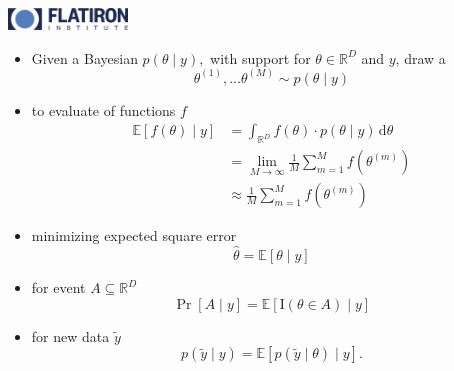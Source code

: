 \documentclass[10pt]{report}
\newcommand{\expect}[1]{\mathbb{E}\!\left[ #1 \right]}
\newcommand{\draw}[2]{#1^{(#2)}}
\begin{document}
\sf \mbox{}
\\[12pt]
\spc{\LARGE\bfseries \color{MidnightBlue}{Multiscale MCMC sampling}}
\\[4pt]
\spc{\Large\bfseries \color{MidnightBlue}{with delayed rejection
    generalized HMC}}
\\[24pt]
\noindent 
\spc{\large\bfseries \color{MidnightBlue}{Bob Carpenter}}
\\[2pt]
\\[-1pt]
\\[2pt]
\vfill 
\noindent 
{}
\hfill
\includegraphics[width=1.25in]{img/flatiron-logo.eps}

\begin{itemize}
\item Given a Bayesian  $p(\theta \mid y),$
  with support for  $\theta \in \mathbb{R}^D$ and  $y$,
  draw a 
  $$
  \draw{\theta}{1}, \ldots \draw{\theta}{M} \sim p(\theta \mid y)
  $$
\item to evaluate  of functions $f$
\begin{align}
  \expect{f(\theta) \mid y}
  &= \int_{\mathbb{R}^D} f(\theta) \cdot p(\theta \mid y) \,
    \textrm{d}\theta
  \\[4pt]
  &= \lim_{M \rightarrow \infty} \frac{1}{M} \sum_{m=1}^M 
f\left( \draw{\theta}{m} \right)
  \\[4pt]
  &\approx \frac{1}{M} \sum_{m=1}^M f\left(\draw{\theta}{m}\right) 
\end{align}
\end{itemize}

\begin{itemize}
\item {} minimizing expected square error
  $$\widehat{\theta} = \expect{\theta \mid y}$$
\item {} for event $A \subseteq \mathbb{R}^D$
  $$\Pr[A \mid y] = \expect{\textrm{I}(\theta \in A) \mid y}$$
\item {} for new data $\widetilde{y}$
  $$p(\widetilde{y} \mid y) = \expect{p(\widetilde{y} \mid \theta)
    \mid y}.$$
\end{itemize}
\end{document}
